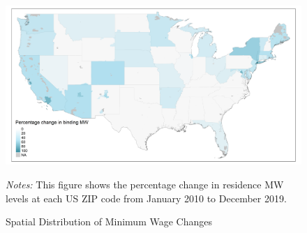 \begin{figure}[h!]
	\centering
	\caption{Spatial Distribution of Minimum Wage Changes}
	\label{fig:mw_perc_changes_long_run}
	\includegraphics[width = \textwidth]
	    {../../analysis/maps_mw_long_run/output/USchange_perc_actual_mw.png}
	\begin{minipage}{.95\textwidth} \footnotesize
		\vspace{3mm}
		\textit{Notes:} This figure shows the percentage change in residence MW levels
		at each US ZIP code from January 2010 to December 2019.
	\end{minipage}
\end{figure}